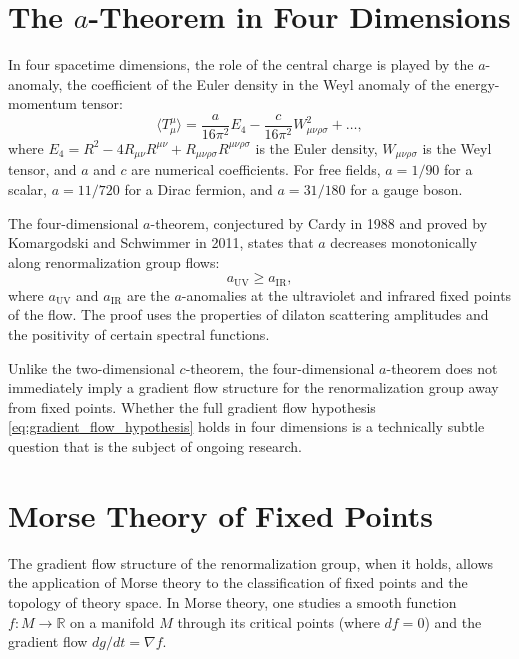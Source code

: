 \documentclass[11pt, twoside, openright]{book}
\theoremstyle{dotted}
\theoremstyle{definition}
\newcommand{\UV}{\mathrm{UV}}          %
\newcommand{\IR}{\mathrm{IR}}          %
\begin{document}
\section{The \texorpdfstring{$a$}{a}-Theorem in Four Dimensions}

In four spacetime dimensions, the role of the central charge is played by the
$a$-anomaly, the coefficient of the Euler density in the Weyl anomaly of the
energy-momentum tensor:
\begin{equation}
  \langle T^\mu_\mu\rangle = \frac{a}{16\pi^2}E_4 - \frac{c}{16\pi^2}W_{\mu\nu\rho\sigma}^2 + \ldots,
  \label{eq:weyl_anomaly}
\end{equation}
where $E_4 = R^2 - 4R_{\mu\nu}R^{\mu\nu} + R_{\mu\nu\rho\sigma}R^{\mu\nu\rho\sigma}$
is the Euler density, $W_{\mu\nu\rho\sigma}$ is the Weyl tensor, and $a$ and $c$
are numerical coefficients. For free fields, $a = 1/90$ for a scalar, $a = 11/720$
for a Dirac fermion, and $a = 31/180$ for a gauge boson.

The four-dimensional $a$-theorem, conjectured by Cardy in 1988 and proved by
Komargodski and Schwimmer in 2011, states that $a$ decreases monotonically along
renormalization group flows:
\begin{equation}
  a_{\UV} \geq a_{\IR},
  \label{eq:a_theorem}
\end{equation}
where $a_{\UV}$ and $a_{\IR}$ are the $a$-anomalies at the ultraviolet and infrared
fixed points of the flow. The proof uses the properties of dilaton scattering
amplitudes and the positivity of certain spectral functions.

Unlike the two-dimensional $c$-theorem, the four-dimensional $a$-theorem does not
immediately imply a gradient flow structure for the renormalization group away from
fixed points. Whether the full gradient flow hypothesis \eqref{eq:gradient_flow_hypothesis}
holds in four dimensions is a technically subtle question that is the subject of
ongoing research.

\section{Morse Theory of Fixed Points}

The gradient flow structure of the renormalization group, when it holds, allows
the application of Morse theory to the classification of fixed points and the
topology of theory space. In Morse theory, one studies a smooth function $f: M
\to \mathbb{R}$ on a manifold $M$ through its critical points (where $df = 0$) and
the gradient flow $dg/dt = \nabla f$.
\end{document}
